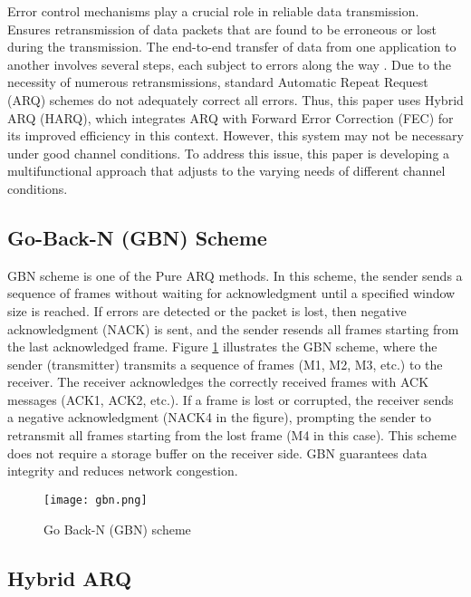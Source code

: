 \documentclass[sn-mathphys-num]{sn-jnl}
\theoremstyle{thmstyleone}
\theoremstyle{thmstyletwo}%
\theoremstyle{thmstylethree}%
\begin{document}
Error control mechanisms play a crucial role in reliable data transmission. Ensures retransmission of data packets that are found to be erroneous or lost during the transmission. The end-to-end transfer of data from one application to another involves several steps, each subject to errors along the way \cite{r5}. Due to the necessity of numerous retransmissions, standard Automatic Repeat Request (ARQ) schemes do not adequately correct all errors. Thus, this paper uses Hybrid ARQ (HARQ), which integrates ARQ with Forward Error Correction (FEC) \cite{r14, r13} for its improved efficiency in this context. However, this system may not be necessary under good channel conditions. To address this issue, this paper is developing a multifunctional approach that adjusts to the varying needs of different channel conditions.

\subsection{Go-Back-N (GBN) Scheme } \label{s1.1}

GBN scheme \cite{r26} is one of the Pure ARQ methods. In this scheme, the sender sends a sequence of frames without waiting for acknowledgment until a specified window size is reached. If errors are detected or the packet is lost, then negative acknowledgment (NACK) \cite{r12}  is sent, and the sender resends all frames starting from the last acknowledged frame. Figure \ref{fig:1} illustrates the GBN scheme, where the sender (transmitter) transmits a sequence of frames (M1, M2, M3, etc.) to the receiver. The receiver acknowledges the correctly received frames with ACK messages (ACK1, ACK2, etc.). If a frame is lost or corrupted, the receiver sends a negative acknowledgment (NACK4 in the figure), prompting the sender to retransmit all frames starting from the lost frame (M4 in this case). This scheme does not require a storage buffer on the receiver side. GBN guarantees data integrity and reduces network congestion.

\begin{figure}[H]
    \centering
    \texttt{[image: gbn.png]}
    \caption{Go Back-N (GBN) scheme \cite{r12}}
    \label{fig:1}
\end{figure}

\subsection{Hybrid ARQ } \label{s1.2}
\end{document}
